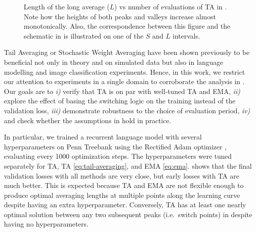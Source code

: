 \documentclass[twocolumn]{article}
\newcommand{\tta}{\liningnums{2}TA}
\begin{document}
\begin{figure}[t]
  \centering
  \caption[Length of the long average ($L$) vs number of evaluations of \tta{}.]{Length of the long average ($L$) vs number of evaluations of \tta{} in .
Note how the heights of both peaks and valleys increase almost monotonically.
Also, the correspondence between this figure and the schematic in  is illustrated on one of the $S$ and $L$ intervals.}
  \label{fig:length}
\end{figure}

Tail Averaging or Stochastic Weight Averaging have been shown previously to be beneficial not only in theory and on simulated data \citep{jain2018parallelizing} but also in language modelling \citep{merity2017regularizing,melis2019mogrifier} and image classification \citep{izmailov2018averaging} experiments.
Hence, in this work, we restrict our attention to experiments in a single domain to corroborate the analysis in .
Our goals are to \emph{i)} verify that \tta{} is on par with well-tuned TA and EMA, \emph{ii)} explore the effect of basing the switching logic on the training instead of the validation loss, \emph{iii)} demonstrate robustness to the choice of evaluation period, \emph{iv)} and check whether the assumptions in  hold in practice.

In particular, we trained a recurrent language model with several hyperparameters on Penn Treebank \citep{mikolov2010recurrent} using the Rectified Adam optimizer \citep{liu2019variance}, evaluating every 1000 optimization steps.
The hyperparameters were tuned separately for \tta{}, TA \cref{eq:tail-averaging}, and EMA \cref{eq:ema}.
 shows that the final validation losses with all methods are very close, but early losses with \tta{} are much better.
This is expected because TA and EMA are not flexible enough to produce optimal averaging lengths at multiple points along the learning curve despite having an extra hyperparameter.
Conversely, \tta{} has at least one nearly optimal solution between any two subsequent peaks (i.e.\ switch points) in  despite having no hyperparameters.
\end{document}
